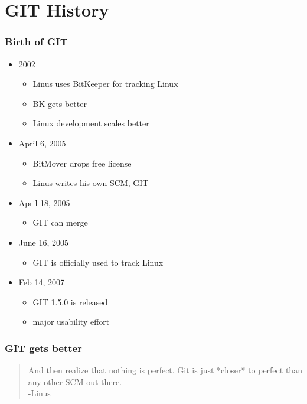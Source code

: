 \documentclass[english]{beamer}
\newcommand{\mysection}[2]{%
  \hypertarget{#2}{}%
  \section{#1}%
  \label{#2}%
}
\begin{document}
\mysection{GIT History}{_git_history}
\begin{frame}
\frametitle{Birth of GIT}
\begin{itemize}
        \item 2002
                \begin{itemize}
                        \item Linus uses BitKeeper for tracking Linux
                        \item BK gets better
                        \item Linux development scales better
                \end{itemize} 
        \pause{}
        \item April 6, 2005
                \begin{itemize}
                        \item BitMover drops free license
                        \item Linus writes his own SCM, GIT
                \end{itemize}
        \pause{}
        \item April 18, 2005
                \begin{itemize}
                        \item GIT can merge
                \end{itemize}
        \pause{}
        \item June 16, 2005
                \begin{itemize}
                        \item GIT is officially used to track Linux
                \end{itemize}
        \pause{}
        \item Feb 14, 2007
                \begin{itemize}
                        \item GIT 1.5.0 is released
                        \item major usability effort
                \end{itemize}
\end{itemize}
\end{frame}

\begin{frame}
\frametitle{GIT gets better}

\begin{quote}
        And then realize that nothing is perfect.
        Git is just *closer* to perfect than any
        other SCM out there. \\
        -Linus
\end{quote}

\end{frame}
\end{document}
